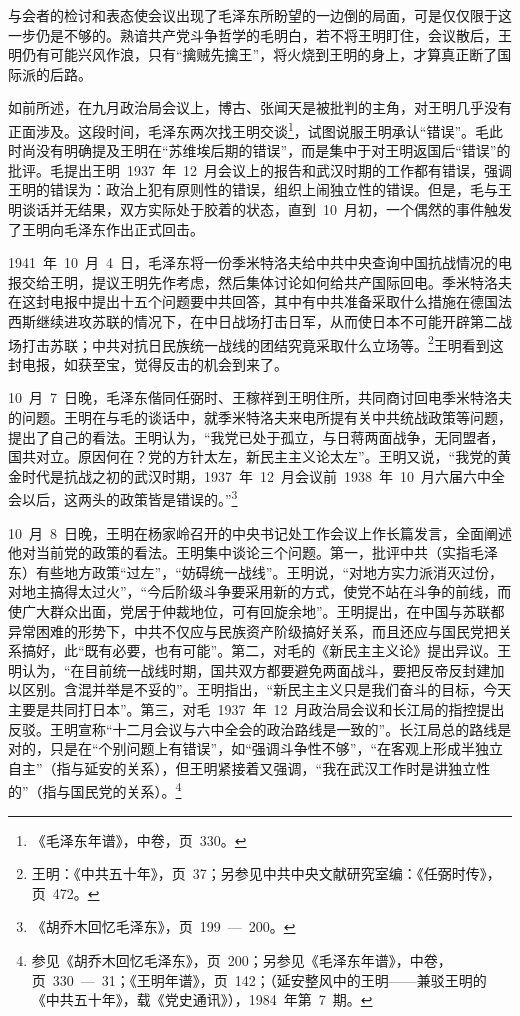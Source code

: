 与会者的检讨和表态使会议出现了毛泽东所盼望的一边倒的局面，可是仅仅限于这一步仍是不够的。熟谙共产党斗争哲学的毛明白，若不将王明盯住，会议散后，王明仍有可能兴风作浪，只有“擒贼先擒王”，将火烧到王明的身上，才算真正断了国际派的后路。

如前所述，在九月政治局会议上，博古、张闻天是被批判的主角，对王明几乎没有正面涉及。这段时间，毛泽东两次找王明交谈\footnote{《毛泽东年谱》，中卷，页~330。}，试图说服王明承认“错误”。毛此时尚没有明确提及王明在“苏维埃后期的错误”，而是集中于对王明返国后“错误”的批评。毛提出王明~1937~年~12~月会议上的报告和武汉时期的工作都有错误，强调王明的错误为：政治上犯有原则性的错误，组织上闹独立性的错误。但是，毛与王明谈话并无结果，双方实际处于胶着的状态，直到~10~月初，一个偶然的事件触发了王明向毛泽东作出正式回击。

1941~年~10~月~4~日，毛泽东将一份季米特洛夫给中共中央查询中国抗战情况的电报交给王明，提议王明先作考虑，然后集体讨论如何给共产国际回电。季米特洛夫在这封电报中提出十五个问题要中共回答，其中有中共准备采取什么措施在德国法西斯继续进攻苏联的情况下，在中日战场打击日军，从而使日本不可能开辟第二战场打击苏联；中共对抗日民族统一战线的团结究竟采取什么立场等。\footnote{王明：《中共五十年》，页~37；另参见中共中央文献研究室编：《任弼时传》，页~472。}王明看到这封电报，如获至宝，觉得反击的机会到来了。

10~月~7~日晚，毛泽东偕同任弼时、王稼祥到王明住所，共同商讨回电季米特洛夫的问题。王明在与毛的谈话中，就季米特洛夫来电所提有关中共统战政策等问题，提出了自己的看法。王明认为，“我党已处于孤立，与日蒋两面战争，无同盟者，国共对立。原因何在？党的方针太左，新民主主义论太左”。王明又说，“我党的黄金时代是抗战之初的武汉时期，1937~年~12~月会议前~1938~年~10~月六届六中全会以后，这两头的政策皆是错误的。”\footnote{《胡乔木回忆毛泽东》，页~199~—~200。}

10~月~8~日晚，王明在杨家岭召开的中央书记处工作会议上作长篇发言，全面阐述他对当前党的政策的看法。王明集中谈论三个问题。第一，批评中共（实指毛泽东）有些地方政策“过左”，“妨碍统一战线”。王明说，“对地方实力派消灭过份，对地主搞得太过火”，“今后阶级斗争要采用新的方式，使党不站在斗争的前线，而使广大群众出面，党居于仲裁地位，可有回旋余地”。王明提出，在中国与苏联都异常困难的形势下，中共不仅应与民族资产阶级搞好关系，而且还应与国民党把关系搞好，此“既有必要，也有可能”。第二，对毛的《新民主主义论》提出异议。王明认为，“在目前统一战线时期，国共双方都要避免两面战斗，要把反帝反封建加以区别。含混并举是不妥的”。王明指出，“新民主主义只是我们奋斗的目标，今天主要是共同打日本”。第三，对毛~1937~年~12~月政治局会议和长江局的指控提出反驳。王明宣称“十二月会议与六中全会的政治路线是一致的”。长江局总的路线是对的，只是在“个别问题上有错误”，如“强调斗争性不够”，“在客观上形成半独立自主”（指与延安的关系），但王明紧接着又强调，“我在武汉工作时是讲独立性的”（指与国民党的关系）。\footnote{参见《胡乔木回忆毛泽东》，页~200；另参见《毛泽东年谱》，中卷，页~330~—~31；《王明年谱》，页~142；（延安整风中的王明——兼驳王明的《中共五十年》，载《党史通讯》），1984~年第~7~期。}


